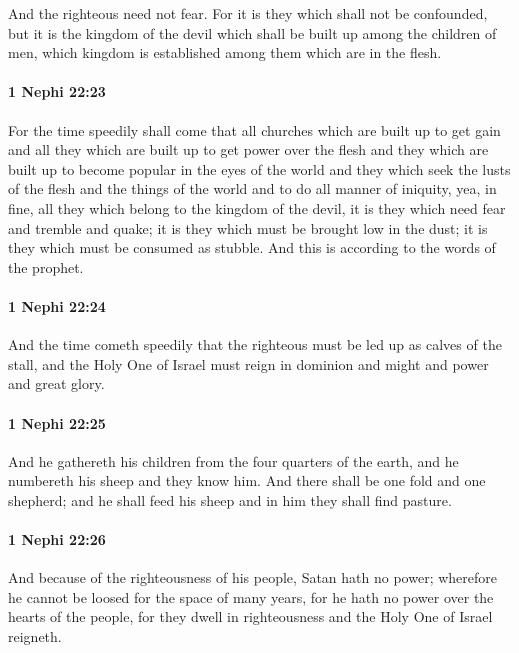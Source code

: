 			And the righteous need not fear.
			For it is they which shall not be confounded,
			but it is the kingdom of the devil
			which shall be built up among the children of men,
			which kingdom is established among them which are in the flesh.

		\paragraph{1 Nephi 22:23} %
			\label{1 Nephi-22-23}

			For the time speedily shall come that all churches
			which are built up to get gain
			and all they which are built up to get power over the flesh
			and they which are built up to become popular in the eyes of the world
			and they which seek the lusts of the flesh and the things of the world
			and to do all manner of iniquity,
			yea, in fine, all they which belong to the kingdom of the devil,
			it is they which need fear and tremble and quake;
			it is they which must be brought low in the dust;
			it is they which must be consumed as stubble.
			And this is according to the words of the prophet.

		\paragraph{1 Nephi 22:24} %
			\label{1 Nephi-22-24}

			And the time cometh speedily
			that the righteous must be led up as calves of the stall,
			and the Holy One of Israel must reign
			in dominion and might and power and great glory.

		\paragraph{1 Nephi 22:25} %
			\label{1 Nephi-22-25}

			And he gathereth his children from the four quarters of the earth,
			and he numbereth his sheep and they know him.
			And there shall be one fold and one shepherd;
			and he shall feed his sheep
			and in him they shall find pasture.

		\paragraph{1 Nephi 22:26} %
			\label{1 Nephi-22-26}

			And because of the righteousness of his people, Satan hath no power;
			wherefore he cannot be loosed for the space of many years,
			for he hath no power over the hearts of the people,
			for they dwell in righteousness
			and the Holy One of Israel reigneth.

